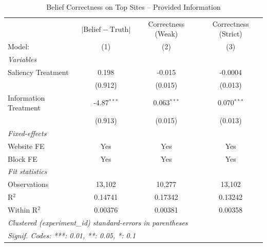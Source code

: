 
\begin{table}[htbp]
   \caption{Belief Correctness on Top Sites -- Provided Information}
   \centering
   \begin{tabular}{lccc}
      \tabularnewline \midrule \midrule
                            & $\lvert \text{Belief} - \text{Truth} \rvert$     & Correctness (Weak) & Correctness (Strict) \\   
      Model:                & (1)                                              & (2)                & (3)\\  
      \midrule
      \emph{Variables}\\
      Saliency Treatment    & 0.198                                            & -0.015             & -0.0004\\   
                            & (0.912)                                          & (0.015)            & (0.013)\\   
      Information Treatment & -4.87$^{***}$                                    & 0.063$^{***}$      & 0.070$^{***}$\\   
                            & (0.913)                                          & (0.015)            & (0.013)\\   
      \midrule
      \emph{Fixed-effects}\\
      Website FE            & Yes                                              & Yes                & Yes\\  
      Block FE              & Yes                                              & Yes                & Yes\\  
      \midrule
      \emph{Fit statistics}\\
      Observations          & 13,102                                           & 10,277             & 13,102\\  
      R$^2$                 & 0.14741                                          & 0.17342            & 0.13242\\  
      Within R$^2$          & 0.00376                                          & 0.00381            & 0.00358\\  
      \midrule \midrule
      \multicolumn{4}{l}{\emph{Clustered (experiment\_id) standard-errors in parentheses}}\\
      \multicolumn{4}{l}{\emph{Signif. Codes: ***: 0.01, **: 0.05, *: 0.1}}\\
   \end{tabular}
\end{table}


